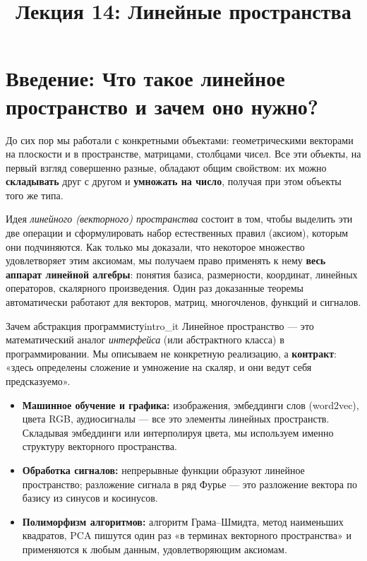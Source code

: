 \documentclass[12pt,a4paper]{article}
\title{Лекция 14: Линейные пространства}
\author{}
\date{}
\begin{document}
\maketitle
\thispagestyle{fancy}

\section*{Введение: Что такое линейное пространство и зачем оно нужно?}

До сих пор мы работали с конкретными объектами: геометрическими
векторами на плоскости и в пространстве, матрицами, столбцами чисел.
Все эти объекты, на первый взгляд совершенно разные, обладают общим
свойством: их можно \textbf{складывать} друг с другом и
\textbf{умножать на число}, получая при этом объекты того же типа.

Идея \emph{линейного (векторного) пространства} состоит в том, чтобы
выделить эти две операции и сформулировать набор естественных правил
(аксиом), которым они подчиняются. Как только мы доказали, что
некоторое множество удовлетворяет этим аксиомам, мы получаем право
применять к нему \textbf{весь аппарат линейной алгебры}: понятия
базиса, размерности, координат, линейных операторов, скалярного
произведения. Один раз доказанные теоремы автоматически работают для
векторов, матриц, многочленов, функций и сигналов.

\begin{remarkIT}{Зачем абстракция программисту}{intro_it}
  Линейное пространство — это математический аналог \emph{интерфейса}
  (или абстрактного класса) в программировании. Мы описываем не
  конкретную реализацию, а \textbf{контракт}: «здесь определены
  сложение и умножение на скаляр, и они ведут себя предсказуемо».
  \begin{itemize}
    \item \textbf{Машинное обучение и графика:} изображения, эмбеддинги
      слов (word2vec), цвета RGB, аудиосигналы — все это элементы
      линейных пространств. Складывая эмбеддинги или интерполируя цвета,
      мы используем именно структуру векторного пространства.
    \item \textbf{Обработка сигналов:} непрерывные функции образуют
      линейное пространство; разложение сигнала в ряд Фурье — это
      разложение вектора по базису из синусов и косинусов.
    \item \textbf{Полиморфизм алгоритмов:} алгоритм Грама–Шмидта, метод
      наименьших квадратов, PCA пишутся один раз «в терминах векторного
      пространства» и применяются к любым данным, удовлетворяющим аксиомам.
  \end{itemize}
\end{remarkIT}
\end{document}
